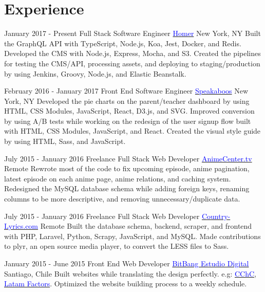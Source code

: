 \documentclass[11pt,a4paper,sans]{moderncv}        %
\begin{document}
\makecvtitle

\section{Experience}

\cventry
  {January 2017 - Present}
  {Full Stack Software Engineer}
  {\textmd{\href{https://learnwithhomer.com}{\textcolor{blue}{Homer}}}}
  {\textmd{New York, NY}}{}
  {
    Built the GraphQL API with TypeScript, Node.js, Koa, Jest, Docker, and Redis.
    Developed the CMS with Node.js, Express, Mocha, and S3.
    Created the pipelines for testing the CMS/API, processing assets, and deploying to staging/production by using Jenkins, Groovy, Node.js, and Elastic Beanstalk.
  }

\cventry
  {February 2016 - January 2017}
  {Front End Software Engineer}
  {\textmd{\href{https://www.speakaboos.com}{\textcolor{blue}{Speakaboos}}}}
  {\textmd{New York, NY}}{}
  {
    Developed the pie charts on the parent/teacher dashboard by using HTML, CSS Modules, JavaScript, React, D3.js, and SVG.
    Improved conversion by using A/B tests while working on the redesign of the user signup flow built with HTML, CSS Modules, JavaScript, and React.
    Created the visual style guide by using HTML, Sass, and JavaScript.
  }

\cventry
  {July 2015 - January 2016}
  {Freelance Full Stack Web Developer}
  {\textmd{\href{http://animecenter.tv}{\textcolor{blue}{AnimeCenter.tv}}}}
  {\textmd{Remote}}{}
  {
    Rewrote most of the code to fix upcoming episode, anime pagination, latest episode on each anime page, anime relations, and caching system.
    Redesigned the MySQL database schema while adding foreign keys, renaming columns to be more descriptive, and removing unnecessary/duplicate data.
  }

\cventry
  {July 2015 - January 2016}
  {Freelance Full Stack Web Developer}
  {\textmd{\href{https://www.country-lyrics.com}{\textcolor{blue}{Country-Lyrics.com}}}}
  {\textmd{Remote}}{}
  {
    Built the database schema, backend, scraper, and frontend with PHP, Laravel, Python, Scrapy, JavaScript, and MySQL.
    Made contributions to plyr, an open source media player, to convert the LESS files to Sass.
  }

\cventry
  {January 2015 - June 2015}
  {Front End Web Developer}
  {\textmd{\href{http://bitbang.cl}{\textcolor{blue}{BitBang Estudio Digital}}}}
  {\textmd{Santiago, Chile}}{}
  {
    Built websites while translating the design perfectly. e.g: \textmd{\href{http://www.cchc.cl}{\textcolor{blue}{CChC}}}, \textmd{\href{http://www.latamfactors.cl}{\textcolor{blue}{Latam Factors}}}.
    Optimized the website building process to a weekly schedule.
  }
\end{document}
